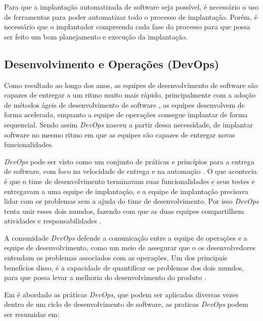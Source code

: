 Para que a implantação automatizada de software seja possível, é necessário o uso
de ferramentas para poder automatizar todo o processo de implantação. Porém, é 
necessário que o implantador compreenda cada fase do processo para que possa ser
feito um bom planejamento e execução da implantação.

\subsection{Desenvolvimento e Operações (DevOps)}
\label{subsec:DevOps}
Como resultado ao longo dos anos, as equipes de desenvolvimento de software
são capazes de entregar a um ritmo muito mais rápido, principalmente com a adoção
de métodos ágeis de desenvolvimento de software \cite{7173368}, as 
equipes desenvolvem de forma acelerada, enquanto a equipe de operações consegue 
implantar de forma sequencial. Sendo assim \textit{DevOps}
nasceu a partir dessa necessidade, de implantar software no mesmo ritmo em que
as equipes são capazes de entregar novas funcionalidades.

\textit{DevOps} pode ser visto como um conjunto de práticas e princípios para a 
entrega de software, com foco na velocidade de entrega e na automação \cite{7173368}. 
O que acontecia é que o time de desenvolvimento terminavam suas funcionalidades e seus testes e
entregavam a uma equipe de implantação, e a equipe de implantação precisava
lidar com os problemas sem a ajuda do time de desenvolvimento. Por isso \textit{DevOps} 
tenta unir esses dois mundos, fazendo com que as duas equipes compartilhem atividades
 e responsabilidades \cite{6265084}.

A comunidade \textit{DevOps} defende a comunicação
entre a equipe de operações e a equipe de desenvolvimento, como um meio de assegurar
que o os desenvolvedores entendam os problemas associados com as operações. Um dos
principais benefícios disso, é a capacidade de quantificar os problemas dos dois mundos,
para que possa levar a melhoria do desenvolvimento do produto \cite{httermann2012DevOps}.

Em  é abordado as práticas \textit{DevOps}, que podem ser 
aplicadas diversas vezes dentro de um ciclo de desenvolvimento de software, as 
praticas \textit{DevOps} podem ser resumidas em:

